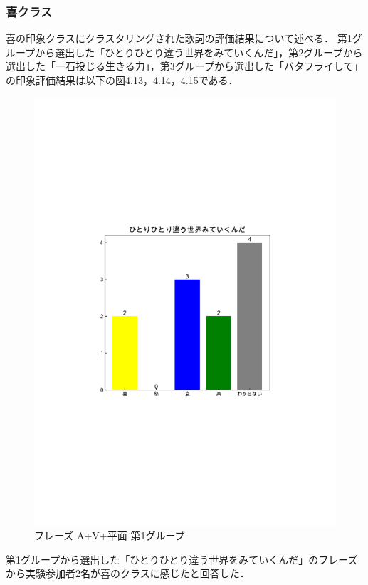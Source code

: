\subsubsection{喜クラス}
喜の印象クラスにクラスタリングされた歌詞の評価結果について述べる．
第1グループから選出した「ひとりひとり違う世界をみていくんだ」，第2グループから選出した「一石投じる生きる力」，第3グループから選出した「バタフライして」の印象評価結果は以下の図4.13，4.14，4.15である．
\begin{figure}[H]
    \centering
    \includegraphics[width=14cm]{431.pdf}
    \vspace{-1mm}
    \caption{フレーズ A+V+平面 第1グループ}
    \label{fig:mms}
    \vspace{5mm}
\end{figure}
第1グループから選出した「ひとりひとり違う世界をみていくんだ」のフレーズから実験参加者2名が喜のクラスに感じたと回答した．
